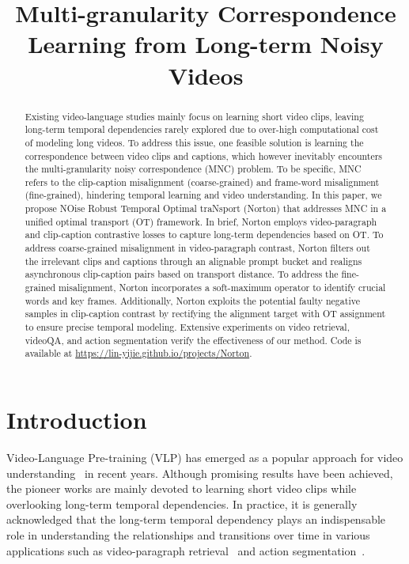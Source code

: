 \title{Multi-granularity Correspondence Learning from Long-term Noisy Videos}



\maketitle

\begin{abstract}
Existing video-language studies mainly focus on learning short video clips, leaving long-term temporal dependencies rarely explored due to over-high computational cost of modeling long videos. To address this issue, one feasible solution is learning the correspondence between video clips and captions, which however inevitably encounters the multi-granularity noisy correspondence (MNC) problem. To be specific, MNC refers to the clip-caption misalignment (coarse-grained) and frame-word misalignment (fine-grained), hindering temporal learning and video understanding. In this paper, we propose NOise Robust Temporal Optimal traNsport (Norton) that addresses MNC in a unified optimal transport (OT) framework. In brief, Norton employs video-paragraph and clip-caption contrastive losses to capture long-term dependencies based on OT. To address coarse-grained misalignment in video-paragraph contrast, Norton filters out the irrelevant clips and captions through an alignable prompt bucket and realigns asynchronous clip-caption pairs based on transport distance. To address the fine-grained misalignment, Norton incorporates a soft-maximum operator to identify crucial words and key frames. Additionally, Norton exploits the potential faulty negative samples in clip-caption contrast by rectifying the alignment target with OT assignment to ensure precise temporal modeling. Extensive experiments on video retrieval, videoQA, and action segmentation verify the effectiveness of our method. 
Code is available at {\href{https://lin-yijie.github.io/projects/Norton}{https://lin-yijie.github.io/projects/Norton}}.
\end{abstract}

\section{Introduction}

Video-Language Pre-training (VLP) has emerged as a popular approach for video understanding~\citep{milnce,bain2021frozen,ge2022bridging,wang2022contrastive,luo2020univl} in recent years. Although promising results have been achieved, the pioneer works are mainly devoted to learning short video clips while overlooking long-term temporal dependencies. In practice, it is generally acknowledged that the long-term temporal dependency plays an indispensable role in understanding the relationships and transitions over time in various applications such as video-paragraph retrieval~\citep{tempclr,sun2022long} and action segmentation~\citep{coin}.


